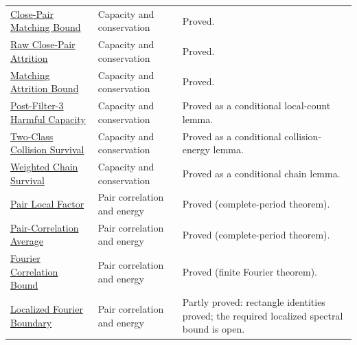 {\begin{longtable}{>{\raggedright\arraybackslash}p{}>{\raggedright\arraybackslash}p{}>{\raggedright\arraybackslash}p{}}
\href{https://github.com/thiagomata/prime-numbers/blob/master/properties/sieve-sequence/local-density-forces-close-pair-matching.md}{Close-Pair Matching Bound} & Capacity and conservation & Proved.\\
\href{https://github.com/thiagomata/prime-numbers/blob/master/properties/sieve-sequence/filtering-attrition-bound-raw-close-pairs.md}{Raw Close-Pair Attrition} & Capacity and conservation & Proved.\\
\href{https://github.com/thiagomata/prime-numbers/blob/master/properties/sieve-sequence/filtering-attrition-bound-close-pair-matching.md}{Matching Attrition Bound} & Capacity and conservation & Proved.\\
\href{https://github.com/thiagomata/prime-numbers/blob/master/properties/sieve-sequence/harmful-residue-capacity-after-filter-three.md}{Post-Filter-3 Harmful Capacity} & Capacity and conservation & Proved as a conditional local-count lemma.\\
\href{https://github.com/thiagomata/prime-numbers/blob/master/properties/sieve-sequence/two-class-survival-from-collision-energy.md}{Two-Class Collision Survival} & Capacity and conservation & Proved as a conditional collision-energy lemma.\\
\href{https://github.com/thiagomata/prime-numbers/blob/master/properties/sieve-sequence/weighted-collision-energy-chain-survival.md}{Weighted Chain Survival} & Capacity and conservation & Proved as a conditional chain lemma.\\
\href{https://github.com/thiagomata/prime-numbers/blob/master/properties/sieve-sequence/two-gap-pair-local-factor-by-separation.md}{Pair Local Factor} & Pair correlation and energy & Proved (complete-period theorem).\\
\href{https://github.com/thiagomata/prime-numbers/blob/master/properties/sieve-sequence/complete-period-two-gap-pair-correlation-average.md}{Pair-Correlation Average} & Pair correlation and energy & Proved (complete-period theorem).\\
\href{https://github.com/thiagomata/prime-numbers/blob/master/properties/sieve-sequence/fourier-two-gap-correlation-prefix-bound.md}{Fourier Correlation Bound} & Pair correlation and energy & Proved (finite Fourier theorem).\\
\href{https://github.com/thiagomata/prime-numbers/blob/master/properties/sieve-sequence/localized-two-gap-correlation-fourier-boundary.md}{Localized Fourier Boundary} & Pair correlation and energy & Partly proved: rectangle identities proved; the required localized spectral bound is open.\\

\end{longtable}}
